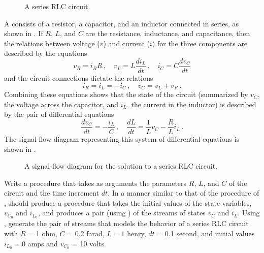 \begin{figure}[tb]
	\centering
	
	\caption{
		A series RLC circuit.
	}
	\label{Figure 3.36}
\end{figure}



\begin{exercise}
	\label{Exercise 3.80}
	A  consists of a resistor, a capacitor, and an inductor connected in series, as shown in .
	If \( R \), \( L \), and \( C \) are the resistance, inductance, and capacitance, then the relations between voltage (\( v \)) and current (\( i \)) for the three components are described by the equations
	\[
		v_R = i_R R \,, \quad
		v_L = L \frac{d i_L}{d t} \,, \quad
		i_C = C \frac{d v_C}{d t}
	\]
	and the circuit connections dictate the relations
	\[
		i_R = i_L = -i_C \,, \quad
		v_C = v_L + v_R \,.
	\]
	Combining these equations shows that the state of the circuit (summarized by \( v_C \), the voltage across the capacitor, and \( i_L \), the current in the inductor) is described by the pair of differential equations
	\[
		\frac{d v_C}{d t} = - \frac{i_L}{C} \,,
		\quad
		\frac{d L}{d t} = \frac{1}{L} v_C - \frac{R}{L} i_L \,.
		\]
	The signal-flow diagram representing this system of differential equations is shown in .
\end{exercise}



\begin{figure}[tb]
	\centering
	
	\caption{
		A signal-flow diagram for the solution to a series RLC circuit.
	}
	\label{Figure 3.37}
\end{figure}



\begin{exercise}
	Write a procedure  that takes as arguments the parameters \( R \), \( L \), and \( C \) of the circuit and the time increment \( dt \).
	In a manner similar to that of the  procedure of ,  should produce a procedure that takes the initial values of the state variables, \( v_{C_0} \) and \( i_{L_0} \), and produces a pair (using ) of the streams of states \( v_C \) and \( i_L \).
	Using , generate the pair of streams that models the behavior of a series RLC circuit with \( R \) = 1 ohm, \( C \) = 0.2 farad, \( L  = 1 \) henry, \( dt \) = 0.1 second, and initial values \( i_{L_0} = 0 \) amps and \( v_{C_0} \) = 10 volts.
\end{exercise}



